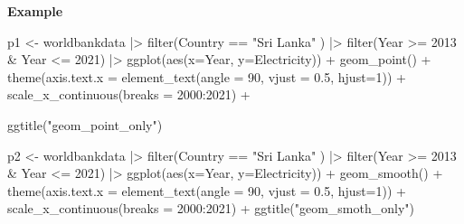 \documentclass[
  letterpaper,
  DIV=11,
  numbers=noendperiod]{scrreprt}
\newenvironment{Shaded}{\begin{snugshade}}{\end{snugshade}}
\newcommand{\AttributeTok}[1]{\textcolor[rgb]{0.40,0.45,0.13}{#1}}
\newcommand{\DecValTok}[1]{\textcolor[rgb]{0.68,0.00,0.00}{#1}}
\newcommand{\FloatTok}[1]{\textcolor[rgb]{0.68,0.00,0.00}{#1}}
\newcommand{\FunctionTok}[1]{\textcolor[rgb]{0.28,0.35,0.67}{#1}}
\newcommand{\NormalTok}[1]{\textcolor[rgb]{0.00,0.23,0.31}{#1}}
\newcommand{\OtherTok}[1]{\textcolor[rgb]{0.00,0.23,0.31}{#1}}
\newcommand{\SpecialCharTok}[1]{\textcolor[rgb]{0.37,0.37,0.37}{#1}}
\newcommand{\StringTok}[1]{\textcolor[rgb]{0.13,0.47,0.30}{#1}}
\begin{document}
\textbf{Example}

\begin{Shaded}
\begin{Highlighting}[]
\NormalTok{p1 }\OtherTok{\textless{}{-}}\NormalTok{ worldbankdata }\SpecialCharTok{|\textgreater{}}
  \FunctionTok{filter}\NormalTok{(Country }\SpecialCharTok{==} \StringTok{"Sri Lanka"}\NormalTok{ ) }\SpecialCharTok{|\textgreater{}}
  \FunctionTok{filter}\NormalTok{(Year }\SpecialCharTok{\textgreater{}=} \DecValTok{2013} \SpecialCharTok{\&}\NormalTok{ Year }\SpecialCharTok{\textless{}=} \DecValTok{2021}\NormalTok{) }\SpecialCharTok{|\textgreater{}} 
  \FunctionTok{ggplot}\NormalTok{(}\FunctionTok{aes}\NormalTok{(}\AttributeTok{x=}\NormalTok{Year, }\AttributeTok{y=}\NormalTok{Electricity)) }\SpecialCharTok{+} 
  \FunctionTok{geom\_point}\NormalTok{() }\SpecialCharTok{+}
  \FunctionTok{theme}\NormalTok{(}\AttributeTok{axis.text.x =} \FunctionTok{element\_text}\NormalTok{(}\AttributeTok{angle =} \DecValTok{90}\NormalTok{, }\AttributeTok{vjust =} \FloatTok{0.5}\NormalTok{, }\AttributeTok{hjust=}\DecValTok{1}\NormalTok{)) }\SpecialCharTok{+} 
  \FunctionTok{scale\_x\_continuous}\NormalTok{(}\AttributeTok{breaks =} \DecValTok{2000}\SpecialCharTok{:}\DecValTok{2021}\NormalTok{)  }\SpecialCharTok{+} 

  \FunctionTok{ggtitle}\NormalTok{(}\StringTok{"geom\_point\_only"}\NormalTok{)}

\NormalTok{p2 }\OtherTok{\textless{}{-}}\NormalTok{ worldbankdata }\SpecialCharTok{|\textgreater{}} 
  \FunctionTok{filter}\NormalTok{(Country }\SpecialCharTok{==} \StringTok{"Sri Lanka"}\NormalTok{ ) }\SpecialCharTok{|\textgreater{}}
  \FunctionTok{filter}\NormalTok{(Year }\SpecialCharTok{\textgreater{}=} \DecValTok{2013} \SpecialCharTok{\&}\NormalTok{ Year }\SpecialCharTok{\textless{}=} \DecValTok{2021}\NormalTok{) }\SpecialCharTok{|\textgreater{}}
  \FunctionTok{ggplot}\NormalTok{(}\FunctionTok{aes}\NormalTok{(}\AttributeTok{x=}\NormalTok{Year, }\AttributeTok{y=}\NormalTok{Electricity)) }\SpecialCharTok{+} 
  \FunctionTok{geom\_smooth}\NormalTok{() }\SpecialCharTok{+}
  \FunctionTok{theme}\NormalTok{(}\AttributeTok{axis.text.x =} \FunctionTok{element\_text}\NormalTok{(}\AttributeTok{angle =} \DecValTok{90}\NormalTok{, }\AttributeTok{vjust =} \FloatTok{0.5}\NormalTok{, }\AttributeTok{hjust=}\DecValTok{1}\NormalTok{)) }\SpecialCharTok{+} 
  \FunctionTok{scale\_x\_continuous}\NormalTok{(}\AttributeTok{breaks =} \DecValTok{2000}\SpecialCharTok{:}\DecValTok{2021}\NormalTok{)  }\SpecialCharTok{+} 
  \FunctionTok{ggtitle}\NormalTok{(}\StringTok{"geom\_smoth\_only"}\NormalTok{)}


\end{Highlighting}
\end{Shaded}
\end{document}
